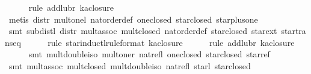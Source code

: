 \begin{isabellebody}
\ \ \ \ \isamarkupfalse%
\ {}rule\ add{}lub{}r{}{}\ ka{}closure{}{}\isanewline
\ \ \ \ \isamarkupfalse%
\ {}metis\ distr\ mult{}onel\ nat{}order{}def\ one{}closed\ star{}closed\ star{}plus{}one{}\isanewline
\ \ \ \ \isamarkupfalse%
\ {}smt\ subdistl\ distr\ mult{}assoc\ mult{}closed\ nat{}order{}def\ star{}closed\ star{}ext\ star{}trans{}eq{}\isanewline
\ \ \ \ \isamarkupfalse%
\ {}rule\ star{}inductl{}rule{}format{}{}\ ka{}closure{}{}\isanewline
\ \ \ \ \isamarkupfalse%
\ {}rule\ add{}lub{}r{}{}\ ka{}closure{}{}\isanewline
\ \ \ \ \isamarkupfalse%
\ {}smt\ mult{}double{}iso\ mult{}oner\ nat{}refl\ one{}closed\ star{}closed\ star{}ref{}\isanewline
\ \ \ \ \isamarkupfalse%
\ {}smt\ mult{}assoc\ mult{}closed\ mult{}double{}iso\ nat{}refl\ star{}{}l\ star{}closed{}%

\end{isabellebody}
